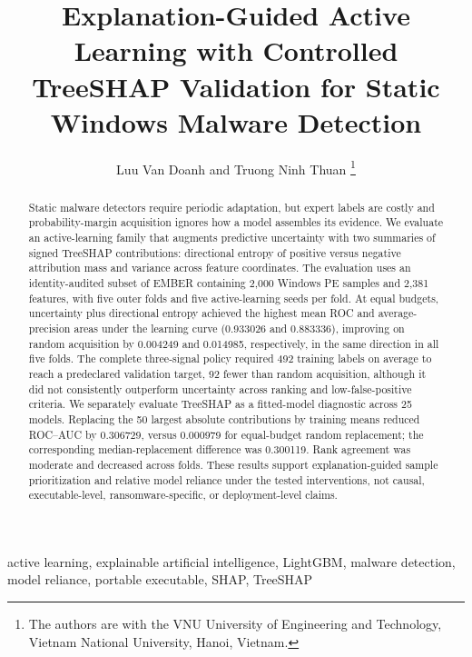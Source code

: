 \documentclass[journal]{IEEEtran}
\title{Explanation-Guided Active Learning with Controlled TreeSHAP Validation
for Static Windows Malware Detection}
\author{Luu Van Doanh and Truong Ninh Thuan%
\thanks{The authors are with the VNU University of Engineering and Technology,
Vietnam National University, Hanoi, Vietnam.}%
}
\begin{document}
\maketitle

\begin{abstract}
Static malware detectors require periodic adaptation, but expert labels are
costly and probability-margin acquisition ignores how a model assembles its
evidence. We evaluate an active-learning family that augments predictive
uncertainty with two summaries of signed TreeSHAP contributions: directional
entropy of positive versus negative attribution mass and variance across feature
coordinates. The evaluation uses an identity-audited subset of EMBER containing
2,000 Windows PE samples and 2,381 features, with five outer folds and five
active-learning seeds per fold. At equal budgets, uncertainty plus directional
entropy achieved the highest mean ROC and average-precision areas under the
learning curve (0.933026 and 0.883336), improving on random acquisition by
0.004249 and 0.014985, respectively, in the same direction in all five folds.
The complete three-signal policy required 492 training labels on average to reach
a predeclared validation target, 92 fewer than random acquisition, although it
did not consistently outperform uncertainty across ranking and low-false-positive
criteria. We separately evaluate TreeSHAP as a fitted-model diagnostic across 25
models. Replacing the 50 largest absolute contributions by training means reduced
ROC--AUC by 0.306729, versus 0.000979 for equal-budget random replacement; the
corresponding median-replacement difference was 0.300119. Rank agreement was
moderate and decreased across folds. These results support explanation-guided
sample prioritization and relative model reliance under the tested interventions,
not causal, executable-level, ransomware-specific, or deployment-level claims.
\end{abstract}

\begin{IEEEkeywords}
active learning, explainable artificial intelligence, LightGBM, malware
detection, model reliance, portable executable, SHAP, TreeSHAP
\end{IEEEkeywords}











\appendices

\clearpage



\end{document}
